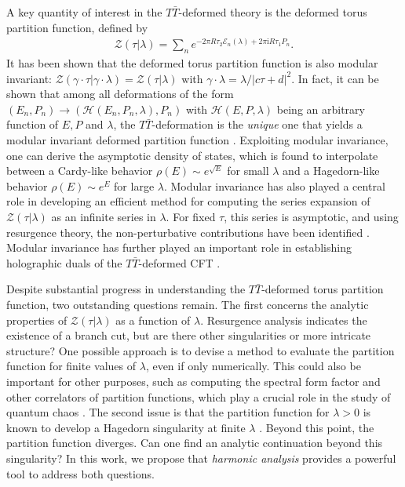 \documentclass[aps,twocolumn,prl,showpacs,amsmath,amssymb,10pt]{revtex4-2}
\begin{document}
A key quantity of interest in the $T\bar{T}$-deformed theory is the deformed torus partition function, defined by
\begin{align}
\mathcal{Z}(\tau|\lambda)=\sum_n e^{-2\pi R\tau_2\mathcal{E}_n(\lambda)+2\pi\mathrm{i}R\tau_1 P_n}.
\end{align}
It has been shown that the deformed torus partition function is also modular invariant: $\mathcal{Z}(\gamma\cdot\tau|\gamma\cdot\lambda)=\mathcal{Z}(\tau|\lambda)$ with $\gamma\cdot\lambda=\lambda/|c\tau+d|^2$. In fact, it can be shown that among all deformations of the form $(E_n,P_n)\to (\mathcal{H}(E_n,P_n,\lambda),P_n)$ with $\mathcal{H}(E,P,\lambda)$ being an arbitrary function of $E,P$ and $\lambda$, the $T\bar{T}$-deformation is the \emph{unique} one that yields a modular invariant deformed partition function \cite{Aharony:2018bad}. Exploiting modular invariance, one can derive the asymptotic density of states, which is found to interpolate between a Cardy-like behavior $\rho(E)\sim e^{\sqrt{E}}$ for small $\lambda$ and a Hagedorn-like behavior $\rho(E)\sim e^{E}$ for large $\lambda$. Modular invariance has also played a central role in developing an efficient method for computing the series expansion of $\mathcal{Z}(\tau|\lambda)$ as an infinite series in $\lambda$. For fixed $\tau$, this series is asymptotic, and using resurgence theory, the non-perturbative contributions have been identified \cite{Gu:2024ogh,Gu:2025tpy}. Modular invariance has further played an important role in establishing holographic duals of the $T\bar{T}$-deformed CFT \cite{McGough:2016lol,Chen:2019mis,Apolo:2023vnm,Guica:2019nzm,Hirano:2020nwq,Apolo:2023aho,Dei:2024sct}.

Despite substantial progress in understanding the $T\bar{T}$-deformed torus partition function, two outstanding questions remain. The first concerns the analytic properties of $\mathcal{Z}(\tau|\lambda)$ as a function of $\lambda$. Resurgence analysis indicates the existence of a branch cut, but are there other singularities or more intricate structure? One possible approach is to devise a method to evaluate the partition function for finite values of $\lambda$, even if only numerically. This could also be important for other purposes, such as computing the spectral form factor and other correlators of partition functions, which play a crucial role in the study of quantum chaos \cite{Cotler:2016fpe,Dyer:2016pou}. The second issue is that the partition function for $\lambda>0$ is known to develop a Hagedorn singularity at finite $\lambda$ \cite{Datta:2018thy}. Beyond this point, the partition function diverges. Can one find an analytic continuation beyond this singularity? In this work, we propose that \emph{harmonic analysis} provides a powerful tool to address both questions.
\end{document}
